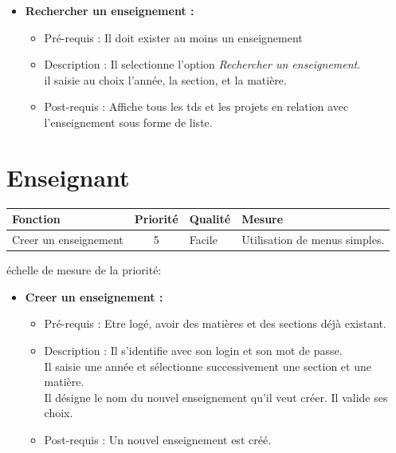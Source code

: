 \begin{itemize}
\item {\bf Rechercher un enseignement :}
	\begin{itemize}
	\item Pr{\'e}-requis : Il doit exister au moins un enseignement
	\item Description : Il selectionne l'option {\it Rechercher un enseignement}.\\
	il saisie au choix l'ann{\'e}e, la section, et la mati{\`e}re. 
	\item Post-requis : Affiche tous les tds et les projets en relation avec l'enseignement sous forme de liste.
	\end{itemize}
\end{itemize}

\section*{Enseignant}

\begin{tabular}{|p{4cm}|c|p{4cm}|p{5cm}|}
\hline
  Fonction & Priorit{\'e} & Qualit{\'e} & Mesure \\
\hline
Creer un enseignement & 5 & Facile & Utilisation de menus simples.\\
\end{tabular}

\begin{center}
{\'e}chelle de mesure de la priorit{\'e}:

\end{center}

\begin{itemize}
\item {\bf Creer un enseignement :}
	\begin{itemize}
	\item Pr{\'e}-requis : Etre log{\'e}, avoir des mati{\`e}res et des sections d{\'e}j{\`a} existant. 
	\item Description : Il s'identifie avec son login et son mot de passe. \\
	Il saisie une ann{\'e}e et s{\'e}lectionne successivement une section et une mati{\`e}re.\\
	Il d{\'e}signe le nom du nouvel enseignement qu'il veut cr{\'e}er. Il valide ses choix.
	\item Post-requis : Un nouvel enseignement est cr{\'e}{\'e}.
	\end{itemize}
\end{itemize}



